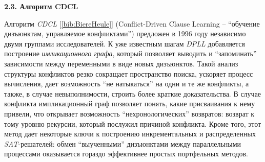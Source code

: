 \vspace{5pt}
\textbf{2.3. Алгоритм CDCL}\label{chapters:2.3}
\vspace{5pt}

Алгоритм \textit{CDCL} [\ref{bib:BiereHeule}] (Conflict-Driven Clause Learning – \enquote{обучение дизъюнктам, управляемое конфликтами}) предложен в 1996 году независимо двумя группами исследователей. К уже известным шагам \textit{DPLL} добавляется построение \textit{имликационного графа}, который позволяет выводить и \enquote{запоминать} зависимости между переменными в виде новых дизъюнктов. Такой анализ структуры конфликтов резко сокращает пространство поиска, ускоряет процесс вычисления, дает возможность \enquote{не натыкаться} на одни и те же конфликты, а также, в случае невыполнимости, строить более краткие доказательства. В случае конфликта импликационный граф позволяет понять, какие присваивания к нему привели, что открывает возможность \enquote{нехронологических} возвратов: возврат к тому уровню рекурсии, который послужил причиной конфликта. Кроме того, этот метод дает некоторые ключи к построению инкрементальных и распределенных \textit{SAT}-решателей: обмен \enquote{выученными} дизъюнктами между параллельными процессами оказывается гораздо эффективнее простых портфельных методов.

